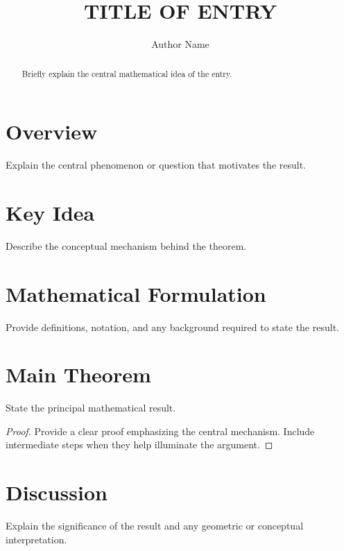 \documentclass[11pt]{article}
\title{TITLE OF ENTRY}
\author{Author Name}
\date{}
\begin{document}
\maketitle

\begin{abstract}
Briefly explain the central mathematical idea of the entry.
\end{abstract}

\section*{Overview}

Explain the central phenomenon or question that motivates the result.

\section{Key Idea}

Describe the conceptual mechanism behind the theorem.

\section{Mathematical Formulation}

Provide definitions, notation, and any background required to state the result.

\section{Main Theorem}

\begin{theorem}
State the principal mathematical result.
\end{theorem}

\begin{proof}
Provide a clear proof emphasizing the central mechanism.
Include intermediate steps when they help illuminate the argument.
\end{proof}

\section{Discussion}

Explain the significance of the result and any geometric or conceptual interpretation.
\end{document}
